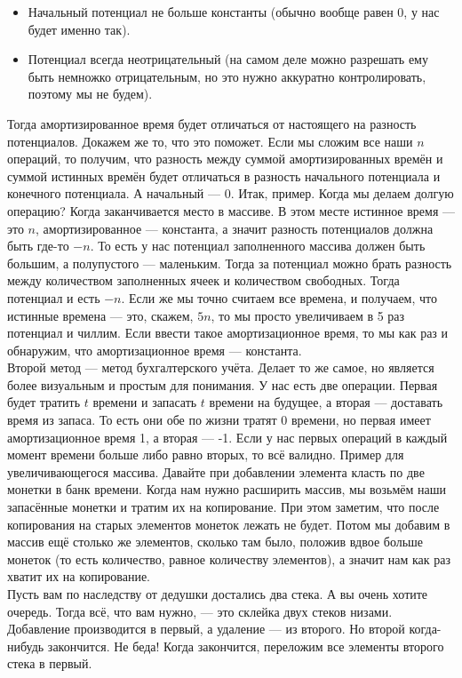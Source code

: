 \documentclass{article}
\begin{document}
    \begin{itemize}
        \item Начальный потенциал не больше константы (обычно вообще равен 0, у нас будет именно так).
        \item Потенциал всегда неотрицательный (на самом деле можно разрешать ему быть немножко отрицательным, но это нужно аккуратно контролировать, поэтому мы не будем).
    \end{itemize}
    Тогда амортизированное время будет отличаться от настоящего на разность потенциалов. Докажем же то, что это поможет. Если мы сложим все наши $n$ операций, то получим, что разность между суммой амортизированных времён и суммой истинных времён будет отличаться в разность начального потенциала и конечного потенциала. А начальный --- 0. Итак, пример. Когда мы делаем долгую операцию? Когда заканчивается место в массиве. В этом месте истинное время --- это $n$, амортизированное --- константа, а значит разность потенциалов должна быть где-то $-n$. То есть у нас потенциал заполненного массива должен быть большим, а полупустого --- маленьким. Тогда за потенциал можно брать разность между количеством заполненных ячеек и количеством свободных. Тогда потенциал и есть $-n$. Если же мы точно считаем все времена, и получаем, что истинные времена --- это, скажем, $5n$, то мы просто увеличиваем в 5 раз потенциал и чиллим. Если ввести такое амортизационное время, то мы как раз и обнаружим, что амортизационное время --- константа.\\
    Второй метод --- метод бухгалтерского учёта. Делает то же самое, но является более визуальным и простым для понимания. У нас есть две операции. Первая будет тратить $t$ времени и запасать $t$ времени на будущее, а вторая --- доставать время из запаса. То есть они обе по жизни тратят 0 времени, но первая имеет амортизационное время 1, а вторая --- -1. Если у нас первых операций в каждый момент времени больше либо равно вторых, то всё валидно. Пример для увеличивающегося массива. Давайте при добавлении элемента класть по две монетки в банк времени. Когда нам нужно расширить массив, мы возьмём наши запасённые монетки и тратим их на копирование. При этом заметим, что после копирования на старых элементов монеток лежать не будет. Потом мы добавим в массив ещё столько же элементов, сколько там было, положив вдвое больше монеток (то есть количество, равное количеству элементов), а значит нам как раз хватит их на копирование.\\
    Пусть вам по наследству от дедушки достались два стека. А вы очень хотите очередь. Тогда всё, что вам нужно, --- это склейка двух стеков низами. Добавление производится в первый, а удаление --- из второго. Но второй когда-нибудь закончится. Не беда! Когда закончится, переложим все элементы второго стека в первый.
\end{document}
